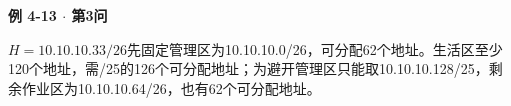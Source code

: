 {\color{ink}\bfseries 例 4-13 \(\cdot \) 第3问}\par\vspace{1bp}\(H=\allowbreak{}10.10.10.33/\allowbreak{}26\)先固定管理区为10.10.10.0/\allowbreak{}26，可分配62个地址。生活区至少120个地址，需/\allowbreak{}25的126个可分配地址；为避开管理区只能取10.10.10.128/\allowbreak{}25，剩余作业区为10.10.10.64/\allowbreak{}26，也有62个可分配地址。
